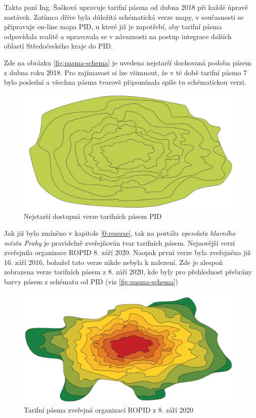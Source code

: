 Takto paní Ing. Šašková upravuje tarifní pásma od dubna 2018 při každé úpravě zastávek. 
Zatímco dříve byla důležitá schématická verze mapy, v současnosti se připravuje on-line mapa PID, u které již je zapotřebí, 
aby tarifní pásma odpovídala realitě a upravovala se v návaznosti na postup
integrace dalších oblastí Středočeského kraje do PID.

Zde na obrázku \ref{fig:pasma-schema} je uvedena nejstarší dochovaná podoba pásem z dubna roku 2018.
Pro zajímavost si lze všimnout, že v té době tarifní pásmo 7 bylo poslední a všechna pásma tvarově připomínala
spíše tu schématickou verzi.

\begin{figure}[H] \centering
    \includegraphics[width=400pt]{./pictures/pasma-nejstarsi.png}
    \caption[Nejstarší dostupná verze tarifních pásem PID]{Nejstarší dostupná verze tarifních pásem PID}
	\label{fig:pasma-nejstarsi}                                
\end{figure}

Jak již bylo zmíněno v kapitole \ref{0-reserse}, tak na portálu \textit{opendata hlavního města Prahy}
je pravidelně zveřejňován tvar tarifních pásem. Nejnovější verzi zveřejnila organizace ROPID 8. září 2020.
Naopak první verze byla zveřejněna již 16. září 2016, bohužel tato verze nikde nebyla k nalezení.
Zde je alespoň zobrazena verze tarifních pásem z 8. září 2020, kde byly pro přehlednost 
přebrány barvy pásem z schématu od PID (viz \ref{fig:pasma-schema})

\begin{figure}[H] \centering
    \includegraphics[width=400pt]{./pictures/pasma-ROPID.png}
    \caption[Tarifní pásma zveřejná organizací ROPID z 8. září 2020]{Tarifní pásma zveřejná organizací ROPID z 8. září 2020}
	\label{fig:pasma-ROPID}                                
\end{figure}


